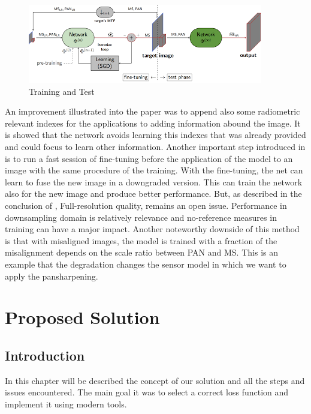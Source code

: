 \documentclass[12pt]{report}
\begin{document}
\begin{figure}[t]
    \centering
    \includegraphics[scale=.9]{pnn-training.png}
    \caption{Training and Test\cite{pnn2}}
    \label{fig:pnn-training}
\end{figure}

An improvement illustrated into the paper was to append also some radiometric relevant indexes  for the applications
to adding information abound the image. It is showed that the network avoids learning this indexes that was already
provided and could focus to learn other information.
Another important step introduced in \cite{pnn2} is to run a fast session of fine-tuning before the 
application of the model to an image with the same procedure of the training.
With the fine-tuning, the net can learn to fuse the new image in a downgraded version.
This can train the network also for the new image and produce better performance.
But, as described in the conclusion of \cite{pnn2}, Full-resolution quality,
remains an open issue. Performance in downsampling domain is relatively relevance and
no-reference measures in training can have a major impact.
Another noteworthy downside of this method is that with misaligned images, the model is trained
with a fraction of the misalignment depends on the scale ratio between PAN and MS. 
This is an example that the degradation changes the sensor model in which we want to apply the pansharpening.

\newpage

\chapter{Proposed Solution}

\section{Introduction}

In this chapter will be described the concept of our solution and all the steps and issues encountered.
The main goal it was to select a correct loss function and implement it using modern tools.
\end{document}
